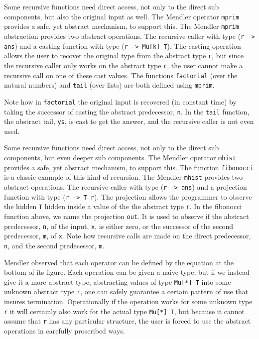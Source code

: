 Some recursive functions need direct access, not only to the direct sub components,
but also the original input as well. The Mendler operator \verb+mprim+ provides
a safe, yet abstract mechanism, to support this. The Mendler \verb+mprim+
abstraction provides two abstract operations. The recursive caller with type
(\verb+r -> ans+) and a casting function with type (\verb+r -> Mu[k] T+). The
casting operation allows the user to recover the original type from the abstract
type \verb+r+, but since the recursive caller
only works on the abstract type \verb+r+, the user cannot make a recursive call
on one of these cast values. The functions
\verb+factorial+ (over the natural numbers) and \verb+tail+ (over lists) are both
defined using \verb+mprim+.

Note how in \verb+factorial+ the original input is recovered (in constant time)
by taking the successor of casting the abstract predecessor, \verb+n+. In the
\verb+tail+ function, the abstract tail, \verb+ys+, is cast to get the
answer, and the recursive caller is not even used.

Some recursive functions need direct access, not only to the direct sub components,
but even deeper sub components. The Mendler operator \verb+mhist+ provides
a safe, yet abstract mechanism, to support this. The function \verb+fibonocci+
is a classic example of this kind of recursion.  The Mendler \verb+mhist+
provides two abstract operations. The recursive caller with type
(\verb+r -> ans+) and a projection function with type (\verb+r -> T r+). The projection
allows the programmer to observe the hidden \verb+T+ hidden inside a value
of the the abstract type \verb+r+.
In the fibonocci function above, we name the projection \verb+out+. It is used
to observe if the abstract predecessor, \verb+n+, of the input, \verb+x+, is either
zero, or the successor of the second predecessor, \verb+m+, of \verb+x+. Note
how recursive calls are made on the direct predecessor, \verb+n+, and the second  predecessor,
\verb+m+.

Mendler observed that each operator can be defined
by the equation at the bottom of its figure. Each operation can be given
a naive type, but if we instead give it a more abstract type,
abstracting values of type  \verb+Mu[*] T+ into some unknown abstract type \verb+r+, 
one can safely guarantee a certain pattern of use that insures termination.  Operationally
if the operation works for some unknown type \verb+r+
it will certainly also work for the actual type \verb+Mu[*] T+, but because it cannot
assume that \verb+r+ has any particular structure, the user is forced to use
the abstract operations in carefully proscribed ways.
  
